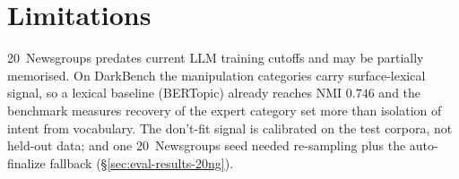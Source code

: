 \section*{Limitations}
\label{sec:limitations}

20~Newsgroups predates current LLM training cutoffs and may be partially
memorised. On DarkBench the manipulation categories carry
surface-lexical signal, so a lexical baseline (BERTopic) already reaches
NMI $0.746$ and the benchmark measures recovery of the expert category
set more than isolation of intent from vocabulary. The don't-fit signal
is calibrated on the test corpora, not held-out data; and one
20~Newsgroups seed needed re-sampling plus the auto-finalize fallback
(\S\ref{sec:eval-results-20ng}).
